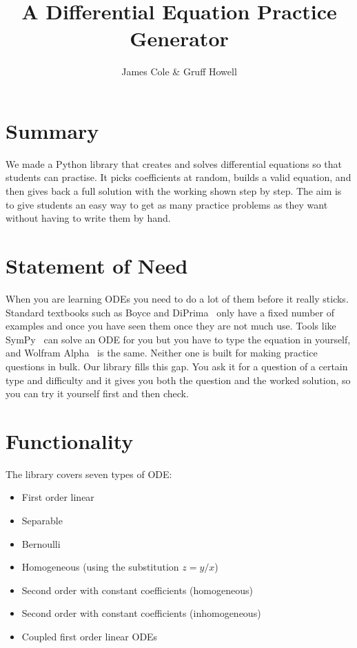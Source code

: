 \documentclass{article}
\title{A Differential Equation Practice Generator}
\author{James Cole & Gruff Howell}
\date{}
\begin{document}
\maketitle

\section{Summary}
We made a Python library that creates and solves differential equations so that students can practise. It picks coefficients at random, builds a valid equation, and then gives back a full solution with the working shown step by step. The aim is to give students an easy way to get as many practice problems as they want without having to write them by hand.

\section{Statement of Need}
When you are learning ODEs you need to do a lot of them before it really sticks. Standard textbooks such as Boyce and DiPrima~\cite{boyce} only have a fixed number of examples and once you have seen them once they are not much use. Tools like SymPy~\cite{sympy} can solve an ODE for you but you have to type the equation in yourself, and Wolfram Alpha~\cite{wolframalpha} is the same. Neither one is built for making practice questions in bulk. Our library fills this gap. You ask it for a question of a certain type and difficulty and it gives you both the question and the worked solution, so you can try it yourself first and then check.

\section{Functionality}
The library covers seven types of ODE:
\begin{itemize}
    \item First order linear
    \item Separable
    \item Bernoulli
    \item Homogeneous (using the substitution $z = y/x$)
    \item Second order with constant coefficients (homogeneous)
    \item Second order with constant coefficients (inhomogeneous)
    \item Coupled first order linear ODEs
\end{itemize}
\end{document}
